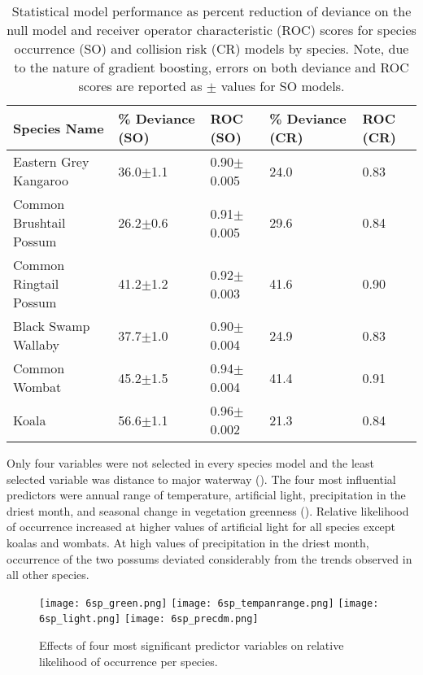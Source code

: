 \begin{table}[htp]
\caption[Statistical model performance for six mammal species]{Statistical model performance as percent reduction of deviance on the null model and receiver operator characteristic (ROC) scores for species occurrence (SO) and collision risk (CR) models by species. Note, due to the nature of gradient boosting, errors on both deviance and ROC scores are reported as $\pm$ values for SO models.}
\begin{tabularx}{\textwidth}{lllll} \toprule
Species Name			&\% Deviance (SO)	&ROC (SO)			&\% Deviance (CR)	&ROC (CR)\\
\midrule 
Eastern Grey Kangaroo	& 36.0$\pm$1.1 		& 0.90$\pm$0.005	& 24.0 				& 0.83 \\ 
Common Brushtail Possum & 26.2$\pm$0.6 		& 0.91$\pm$0.005 	& 29.6 				& 0.84 \\ 
Common Ringtail Possum 	& 41.2$\pm$1.2 		& 0.92$\pm$0.003 	& 41.6 				& 0.90 \\ 
Black Swamp Wallaby 	& 37.7$\pm$1.0 		& 0.90$\pm$0.004 	& 24.9 				& 0.83 \\ 
Common Wombat 			& 45.2$\pm$1.5 		& 0.94$\pm$0.004 	& 41.4 				& 0.91 \\ 
Koala 					& 56.6$\pm$1.1 		& 0.96$\pm$0.002 	& 21.3 				& 0.84 \\ 
\bottomrule
\end{tabularx}
\label{6sp_models}
\end{table}

Only four variables were not selected in every species model and the least selected variable was distance to major waterway (). The four most influential predictors were annual range of temperature, artificial light, precipitation in the driest month, and seasonal change in vegetation greenness (). Relative likelihood of occurrence increased at higher values of artificial light for all species except koalas and wombats. At high values of precipitation in the driest month, occurrence of the two possums deviated considerably from the trends observed in all other species. 

\begin{figure*}[htp]
  \centering
  \texttt{[image: 6sp\_green.png]}
  \texttt{[image: 6sp\_tempanrange.png]}
  \texttt{[image: 6sp\_light.png]}
  \texttt{[image: 6sp\_precdm.png]}
  \caption[Most significant predictor variables on relative likelihood of occurrence for six mammal species]{Effects of four most significant predictor variables on relative likelihood of occurrence per species.}
  \label{6sp_term_occ}
\end{figure*}

